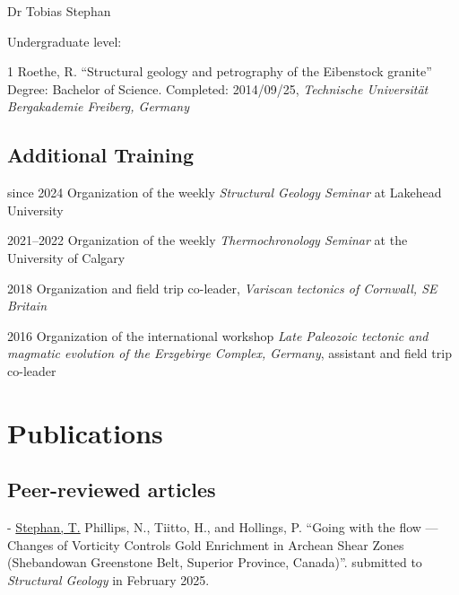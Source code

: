\documentclass[10pt, paper=letter]{scrartcl} %
\begin{document}
\begin{cv}{\textsf{Dr Tobias Stephan}}
\begin{cvlist}{Undergraduate level:}
        \item[1] Roethe, R. \enquote{Structural geology and petrography of the Eibenstock granite}\\
        Degree: Bachelor of Science. Completed: 2014/09/25, \textit{Technische Universität Bergakademie Freiberg, Germany}
    \end{cvlist}

    \subsection{Additional Training}
    \begin{cvlist}{}
        \item[since 2024] Organization of the weekly \textit{Structural Geology Seminar} at
        Lakehead University
        \item[2021--2022] Organization of the weekly \textit{Thermochronology Seminar} at the University of Calgary
        \item[2018] Organization and field trip co-leader, \textit{Variscan tectonics of Cornwall, SE Britain}
        \item[2016] Organization of the international workshop \textit{Late Paleozoic tectonic and magmatic evolution of the Erzgebirge Complex, Germany}, assistant and field trip co-leader
    \end{cvlist}

    \section{Publications}
    \subsection{Peer-reviewed articles}
    \setul{1pt}{.4pt}%
    \begin{cvlist}{}
        \item[-] \ul{Stephan, T.}  Phillips, N., Tiitto, H., and Hollings, P. \enquote{Going with the flow --- Changes of  Vorticity Controls Gold Enrichment in Archean Shear Zones (Shebandowan Greenstone Belt, Superior Province, Canada)}. submitted to \textit{Structural Geology} in February 2025.
        

\end{cvlist}
\end{cv}
\end{document}
